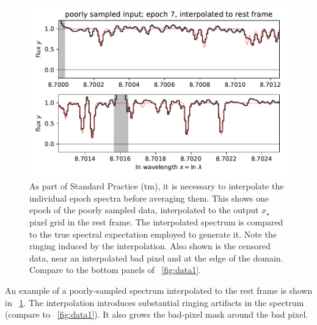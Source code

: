 \documentclass[modern]{aastex631}
\newlength{\figurewidth}
\begin{document}
\begin{figure}[t!]
    \begin{mdframed}\begin{center}
    \includegraphics[width=\figurewidth]{notebooks/datazoom_interpolated.pdf}
    \end{center}
    \caption{As part of Standard Practice (tm), it is necessary to interpolate the individual epoch spectra before averaging them. This shows one epoch of the poorly sampled data, interpolated to the output $x_\star$ pixel grid in the rest frame. The interpolated spectrum is compared to the true spectral expectation employed to generate it. Note the ringing induced by the interpolation. Also shown is the censored data, near an interpolated bad pixel and at the edge of the domain. Compare to the bottom panels of \figurename~\ref{fig:data1}.\label{fig:interpolated}}
    \end{mdframed}
\end{figure}
An example of a poorly-sampled spectrum interpolated to the rest frame is shown in \figurename~\ref{fig:interpolated}.
The interpolation introduces substantial ringing artifacts in the spectrum (compare to \figurename~\ref{fig:data1}).
It also grows the bad-pixel mask around the bad pixel.
\end{document}
